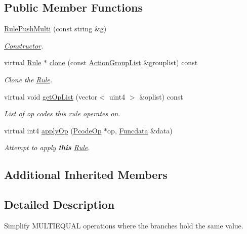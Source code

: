 \subsection*{Public Member Functions}
\begin{DoxyCompactItemize}
\item 
\mbox{\hyperlink{class_rule_push_multi_ac52f203f4e68376cfef7dac8951c3f95}{Rule\+Push\+Multi}} (const string \&g)
\begin{DoxyCompactList}\small\item\em \mbox{\hyperlink{class_constructor}{Constructor}}. \end{DoxyCompactList}\item 
virtual \mbox{\hyperlink{class_rule}{Rule}} $\ast$ \mbox{\hyperlink{class_rule_push_multi_ae44a8242704738c9f0d415c3987da4b3}{clone}} (const \mbox{\hyperlink{class_action_group_list}{Action\+Group\+List}} \&grouplist) const
\begin{DoxyCompactList}\small\item\em Clone the \mbox{\hyperlink{class_rule}{Rule}}. \end{DoxyCompactList}\item 
virtual void \mbox{\hyperlink{class_rule_push_multi_a77532a8920828f0155494cfb01c58f09}{get\+Op\+List}} (vector$<$ uint4 $>$ \&oplist) const
\begin{DoxyCompactList}\small\item\em List of op codes this rule operates on. \end{DoxyCompactList}\item 
virtual int4 \mbox{\hyperlink{class_rule_push_multi_ae0c4fc01da336893e20b3ea0fb9c4f23}{apply\+Op}} (\mbox{\hyperlink{class_pcode_op}{Pcode\+Op}} $\ast$op, \mbox{\hyperlink{class_funcdata}{Funcdata}} \&data)
\begin{DoxyCompactList}\small\item\em Attempt to apply {\bfseries{this}} \mbox{\hyperlink{class_rule}{Rule}}. \end{DoxyCompactList}\end{DoxyCompactItemize}
\subsection*{Additional Inherited Members}


\subsection{Detailed Description}
Simplify M\+U\+L\+T\+I\+E\+Q\+U\+AL operations where the branches hold the same value. 

